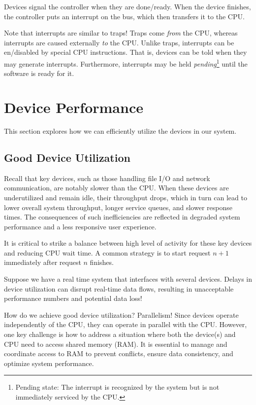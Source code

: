 \documentclass{report}
\newcommand{\exampleBegin}[1]{\begin{tcolorbox}[colback=blue!5!white,colframe=black!75!blue,title={Example:
      #1}]}
\newcommand{\exampleEnd}{\end{tcolorbox}}
\newcommand{\asideBegin}[1]{\begin{tcolorbox}[colback=orange!5!white,colframe=black!75!orange,title={Aside:
      #1}]}
\newcommand{\asideEnd}{\end{tcolorbox}}
\begin{document}
Devices signal the controller when they are done/ready. When the device finishes, the controller
puts an interrupt on the bus, which then transfers it to the CPU.


\asideBegin{CPU's and Interrupts}
Note that interrupts are similar to traps! Traps come \textit{from} the CPU, whereas interrupts are caused
externally \textit{to} the CPU. Unlike traps, interrupts can be en/disabled by special CPU
instructions. That is, devices can be told when they may generate interrupts. Furthermore,
interrupts may be held \textit{pending}\footnote{Pending state: The interrupt is recognized
  by the system but is not immediately serviced by the CPU.} until the software is ready for it.
\asideEnd





\section{Device Performance}
This section explores how we can efficiently utilize the devices in our system.


\subsection{Good Device Utilization}
\label{subsec:GDU}
Recall that key devices, such as those handling file I/O and network communication, are notably
slower than the CPU. When these devices are underutilized and remain idle, their throughput drops,
which in turn can lead to lower overall system throughput, longer service queues, and slower
response times. The consequences of such inefficiencies are reflected in degraded system performance
and a less responsive user experience.

It is critical to strike a balance between high level of activity for these key devices and reducing
CPU wait time. A common strategy is to start request $n + 1$ immediately after request $n$ finishes.

\exampleBegin{Device Delays}
Suppose we have a real time system that interfaces with several devices.  Delays in device
utilization can disrupt real-time data flows, resulting in unacceptable performance numbers and
potential data loss!
\exampleEnd

How do we achieve good device utilization? Parallelism! Since devices operate independently of the
CPU, they can operate in parallel with the CPU. However, one key challenge is how to address a
situation where both the device(s) and CPU need to access shared memory (RAM). It is essential to
manage and coordinate access to RAM to prevent conflicts, ensure data consistency, and optimize
system performance.
\end{document}

